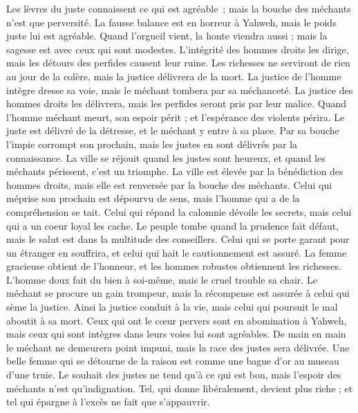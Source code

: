 \begin{multicols}{2}
Les lèvres du juste connaissent ce qui est agréable ; mais la bouche des méchants n’est que perversité.
\VerseOne{}La fausse balance est en horreur à Yahweh, mais le poids juste lui est agréable.
Quand l'orgueil vient, la honte viendra aussi ; mais la sagesse est avec ceux qui sont modestes.
L'intégrité des hommes droits les dirige, mais les détours des perfides causent leur ruine.
Les richesses ne serviront de rien au jour de la colère, mais la justice délivrera de la mort.
La justice de l'homme intègre dresse sa voie, mais le méchant tombera par sa méchanceté.
La justice des hommes droits les délivrera, mais les perfides seront pris par leur malice.
Quand l’homme méchant meurt, son espoir périt ; et l'espérance des violents périra.
Le juste est délivré de la détresse, et le méchant y entre à sa place.
Par sa bouche l’impie corrompt son prochain, mais les justes en sont délivrés par la connaissance.
La ville se réjouit quand les justes sont heureux, et quand les méchants périssent, c’est un triomphe.
La ville est élevée par la bénédiction des hommes droits, mais elle est renversée par la bouche des méchants.
Celui qui méprise son prochain est dépourvu de sens, mais l'homme qui a de la compréhension se tait.
Celui qui répand la calomnie dévoile les secrets, mais celui qui a un coeur loyal les cache.
Le peuple tombe quand la prudence fait défaut, mais le salut est dans la multitude des conseillers.
Celui qui se porte garant pour un étranger en souffrira, et celui qui hait le cautionnement est assuré.
La femme gracieuse obtient de l'honneur, et les hommes robustes obtiennent les richesses.
L'homme doux fait du bien à soi-même, mais le cruel trouble sa chair.
Le méchant se procure un gain trompeur, mais la récompense est assurée à celui qui sème la justice.
Ainsi la justice conduit à la vie, mais celui qui poursuit le mal aboutit à sa mort.
Ceux qui ont le cœur pervers sont en abomination à Yahweh, mais ceux qui sont intègres dans leurs voies lui sont agréables.
De main en main le méchant ne demeurera point impuni, mais la race des justes sera délivrée.
Une belle femme qui se détourne de la raison est comme une bague d'or au museau d'une truie.
Le souhait des justes ne tend qu’à ce qui est bon, mais l'espoir des méchants n'est qu'indignation.
Tel, qui donne libéralement, devient plus riche ; et tel qui épargne à l’excès ne fait que s’appauvrir.

\end{multicols}
